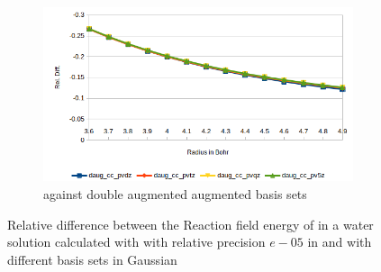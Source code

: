 \documentclass[../master_thesis.tex]{subfiles}
\begin{document}
\begin{figure}[h!]
\begin{subfigure}[b]{0.75\linewidth}
    \includegraphics[width=\linewidth]{img/watdaugreldiff.png}
    \caption{\mrchem against double augmented augmented basis sets}
  \end{subfigure}
  \caption[Relative difference between methods for ]{Relative difference between the Reaction field energy of  in a water solution calculated with with relative precision $e-05$ in \mrchem
   and with different basis sets in Gaussian}
  \label{fig:watreldiffvar}
\end{figure}
\end{document}
